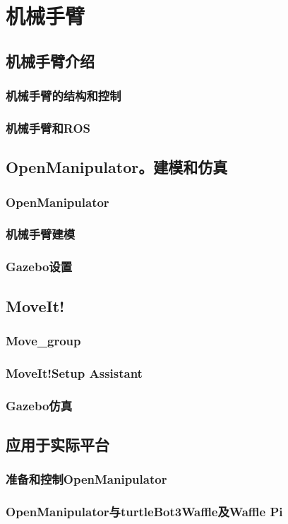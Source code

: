 \documentclass[geye,green,kindle,cn]{elegantnote}
\begin{document}
\section{机械手臂}
\subsection{机械手臂介绍}
\subsubsection{机械手臂的结构和控制}
\subsubsection{机械手臂和ROS}
\subsection{OpenManipulator。建模和仿真}
\subsubsection{OpenManipulator}
\subsubsection{机械手臂建模}
\subsubsection{Gazebo设置}
\subsection{MoveIt!}
\subsubsection{Move\_group}
\subsubsection{MoveIt!Setup Assistant}
\subsubsection{Gazebo仿真}
\subsection{应用于实际平台}
\subsubsection{准备和控制OpenManipulator}
\subsubsection{OpenManipulator与turtleBot3Waffle及Waffle Pi}
\end{document}
